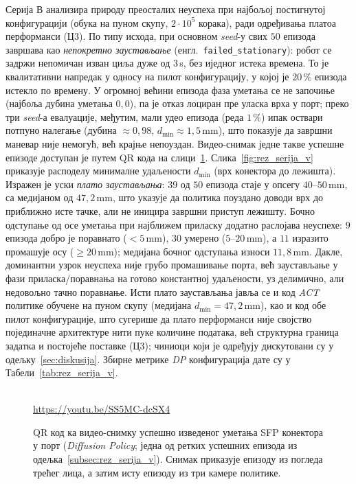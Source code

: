 \documentclass[12pt, a4paper]{article}
\begin{document}
Серија В анализира природу преосталих неуспеха при најбољој постигнутој конфигурацији (обука на пуном скупу, $2\cdot 10^{5}$ корака), ради одређивања платоа перформанси (Ц3).
По типу исхода, при основном \textit{seed}-у свих $50$ епизода завршава као \textit{непокретно заустављање} (енгл.\ \texttt{failed\_stationary}): робот се задржи непомичан изван циља дуже од $3$\,s, без иједног истека времена. То је квалитативни напредак у односу на пилот конфигурацију, у којој је $20\,\%$ епизода истекло по времену.
У огромној већини епизода фаза уметања се не започиње (најбоља дубина уметања $0{,}0$), па је отказ лоциран пре уласка врха у порт; преко три \textit{seed}-а евалуације, међутим, мали удео епизода (реда $1\,\%$) ипак оствари потпуно налегање (дубина $\approx 0{,}98$, $d_{\min}\approx 1{,}5$\,mm), што показује да завршни маневар није немогућ, већ крајње непоуздан.
Видео-снимак једне такве успешне епизоде доступан је путем QR кода на слици~\ref{fig:qr_video}.
Слика~\ref{fig:rez_serija_v} приказује расподелу минималне удаљености $d_{\min}$ (врх конектора до лежишта).
Изражен је уски \emph{плато заустављања}: $39$ од $50$ епизода стаје у опсегу $40$–$50$\,mm, са медијаном од $47{,}2$\,mm, што указује да политика поуздано доводи врх до приближно исте тачке, али не иницира завршни приступ лежишту.
Бочно одступање од осе уметања при најближем приласку додатно раслојава неуспехе: $9$ епизода добро је поравнато ($<5$\,mm), $30$ умерено ($5$–$20$\,mm), а $11$ изразито промашује осу ($\ge 20$\,mm); медијана бочног одступања износи $11{,}8$\,mm.
Дакле, доминантни узрок неуспеха није грубо промашивање порта, већ заустављање у фази приласка/поравнања на готово константној удаљености, уз делимично, али недовољно тачно поравнање.
Исти плато заустављања јавља се и код \textit{ACT} политике обучене на пуном скупу (медијана $d_{\min} = 47{,}2$\,mm), као и код обе пилот конфигурације, што сугерише да плато перформанси није својство појединачне архитектуре нити пуке количине података, већ структурна граница задатка и постојеће поставке (Ц3); чиниоци који је одређују дискутовани су у одељку~\ref{sec:diskusija}.
Збирне метрике \textit{DP} конфигурација дате су у Табели~\ref{tab:rez_serija_v}.

\begin{figure}[htbp]
    \centering
    \\[2.5mm]
    {\small\url{https://youtu.be/SS5MC-dcSX4}}
    \caption[QR код ка видео-снимку успешног уметања]{QR код ка видео-снимку успешно изведеног уметања SFP конектора у
    порт (\textit{Diffusion Policy}; једна од ретких успешних епизода из
    одељка~\ref{subsec:rez_serija_v}). Снимак приказује епизоду из погледа
    трећег лица, а затим исту епизоду из три камере политике.}
    \label{fig:qr_video}
\end{figure}
\end{document}
